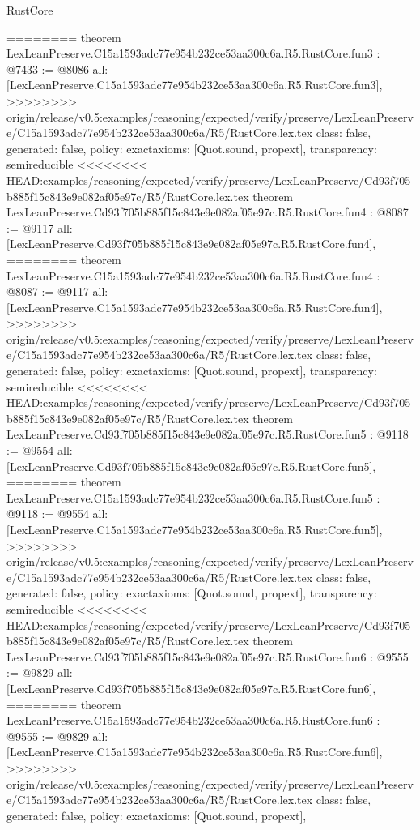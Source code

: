 \begin{lexlean}{RustCore}
\begin{coremodule}
{\begin{coremodule}
{{{{{{========
theorem LexLeanPreserve.C15a1593adc77e954b232ce53aa300c6a.R5.RustCore.fun3 : @7433 := @8086 {
  all: [LexLeanPreserve.C15a1593adc77e954b232ce53aa300c6a.R5.RustCore.fun3],
>>>>>>>> origin/release/v0.5:examples/reasoning/expected/verify/preserve/LexLeanPreserve/C15a1593adc77e954b232ce53aa300c6a/R5/RustCore.lex.tex
  class: false,
  generated: false,
  policy: exact{axioms: [Quot.sound, propext]},
  transparency: semireducible
}
<<<<<<<< HEAD:examples/reasoning/expected/verify/preserve/LexLeanPreserve/Cd93f705b885f15c843e9e082af05e97c/R5/RustCore.lex.tex
theorem LexLeanPreserve.Cd93f705b885f15c843e9e082af05e97c.R5.RustCore.fun4 : @8087 := @9117 {
  all: [LexLeanPreserve.Cd93f705b885f15c843e9e082af05e97c.R5.RustCore.fun4],
========
theorem LexLeanPreserve.C15a1593adc77e954b232ce53aa300c6a.R5.RustCore.fun4 : @8087 := @9117 {
  all: [LexLeanPreserve.C15a1593adc77e954b232ce53aa300c6a.R5.RustCore.fun4],
>>>>>>>> origin/release/v0.5:examples/reasoning/expected/verify/preserve/LexLeanPreserve/C15a1593adc77e954b232ce53aa300c6a/R5/RustCore.lex.tex
  class: false,
  generated: false,
  policy: exact{axioms: [Quot.sound, propext]},
  transparency: semireducible
}
<<<<<<<< HEAD:examples/reasoning/expected/verify/preserve/LexLeanPreserve/Cd93f705b885f15c843e9e082af05e97c/R5/RustCore.lex.tex
theorem LexLeanPreserve.Cd93f705b885f15c843e9e082af05e97c.R5.RustCore.fun5 : @9118 := @9554 {
  all: [LexLeanPreserve.Cd93f705b885f15c843e9e082af05e97c.R5.RustCore.fun5],
========
theorem LexLeanPreserve.C15a1593adc77e954b232ce53aa300c6a.R5.RustCore.fun5 : @9118 := @9554 {
  all: [LexLeanPreserve.C15a1593adc77e954b232ce53aa300c6a.R5.RustCore.fun5],
>>>>>>>> origin/release/v0.5:examples/reasoning/expected/verify/preserve/LexLeanPreserve/C15a1593adc77e954b232ce53aa300c6a/R5/RustCore.lex.tex
  class: false,
  generated: false,
  policy: exact{axioms: [Quot.sound, propext]},
  transparency: semireducible
}
<<<<<<<< HEAD:examples/reasoning/expected/verify/preserve/LexLeanPreserve/Cd93f705b885f15c843e9e082af05e97c/R5/RustCore.lex.tex
theorem LexLeanPreserve.Cd93f705b885f15c843e9e082af05e97c.R5.RustCore.fun6 : @9555 := @9829 {
  all: [LexLeanPreserve.Cd93f705b885f15c843e9e082af05e97c.R5.RustCore.fun6],
========
theorem LexLeanPreserve.C15a1593adc77e954b232ce53aa300c6a.R5.RustCore.fun6 : @9555 := @9829 {
  all: [LexLeanPreserve.C15a1593adc77e954b232ce53aa300c6a.R5.RustCore.fun6],
>>>>>>>> origin/release/v0.5:examples/reasoning/expected/verify/preserve/LexLeanPreserve/C15a1593adc77e954b232ce53aa300c6a/R5/RustCore.lex.tex
  class: false,
  generated: false,
  policy: exact{axioms: [Quot.sound, propext]},
}}}}}}}}}}
\end{coremodule}}
\end{coremodule}
\end{lexlean}
